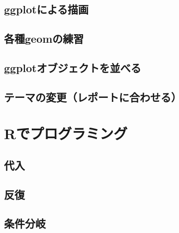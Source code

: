 \documentclass[
  a4paper,
]{ltjsbook}
\begin{document}
\hypertarget{ggplotux306bux3088ux308bux63cfux753b}{%
\section{ggplotによる描画}\label{ggplotux306bux3088ux308bux63cfux753b}}

\hypertarget{ux5404ux7a2egeomux306eux7df4ux7fd2}{%
\section{各種geomの練習}\label{ux5404ux7a2egeomux306eux7df4ux7fd2}}

\hypertarget{ggplotux30aaux30d6ux30b8ux30a7ux30afux30c8ux3092ux4e26ux3079ux308b}{%
\section{ggplotオブジェクトを並べる}\label{ggplotux30aaux30d6ux30b8ux30a7ux30afux30c8ux3092ux4e26ux3079ux308b}}

\hypertarget{ux30c6ux30fcux30deux306eux5909ux66f4ux30ecux30ddux30fcux30c8ux306bux5408ux308fux305bux308b}{%
\section{テーマの変更（レポートに合わせる）}\label{ux30c6ux30fcux30deux306eux5909ux66f4ux30ecux30ddux30fcux30c8ux306bux5408ux308fux305bux308b}}


\hypertarget{rux3067ux30d7ux30edux30b0ux30e9ux30dfux30f3ux30b0}{%
\chapter{Rでプログラミング}\label{rux3067ux30d7ux30edux30b0ux30e9ux30dfux30f3ux30b0}}

\hypertarget{ux4ee3ux5165}{%
\section{代入}\label{ux4ee3ux5165}}

\hypertarget{ux53cdux5fa9}{%
\section{反復}\label{ux53cdux5fa9}}

\hypertarget{ux6761ux4ef6ux5206ux5c90}{%
\section{条件分岐}\label{ux6761ux4ef6ux5206ux5c90}}
\end{document}
